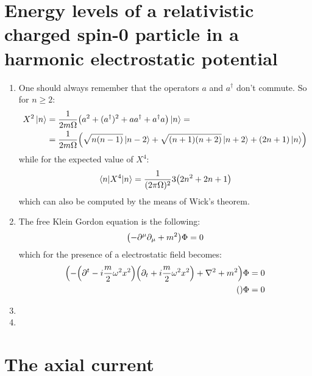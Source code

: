 \documentclass[11pt, oneside]{article}   	%
\begin{document}
\section{Energy levels of a relativistic charged spin-0 particle in a harmonic electrostatic potential}

\begin{enumerate}[label=\alph*)]

\item One should always remember that the operators $a$ and $a^\dagger$ don't commute. So for $n\ge2$:
\begin{align*}
	X^2 \ket{n} &= \frac{1}{2m\Omega} \qty(a^2 + (a^\dagger )^2 + a a^\dagger + a^\dagger a ) \ket{n} =  \\
	&= \frac{1}{2m\Omega} \qty( \sqrt{n(n-1)}\ket{n-2} + \sqrt{(n+1)(n+2)} \ket{n+2} + (2n+1) \ket{n})
\end{align*}
while for the expected value of $X^4$:
\[
	\mel{n}{X^4}{n} =  \frac{1}{(2\pi \Omega)^2} 3 \qty(2n^2 + 2n +1)
\]
which can also be computed by the means of Wick's theorem.

\item The free Klein Gordon equation is the following:
\[
	\qty(- \partial^\mu \partial_\mu + m^2) \Phi = 0
\]
which for the presence of a electrostatic field becomes:
\begin{align*}
	\qty(-\qty(\partial^t - i \frac{m}{2}\omega^2 x^2) \qty(\partial_t + i\frac{m}{2} \omega^2 x^2) + \laplacian + m^2) \Phi &= 0 \\
	\qty(  )\Phi &= 0 
\end{align*}

\item

\item

\end{enumerate}

\section{The axial current}
\end{document}
